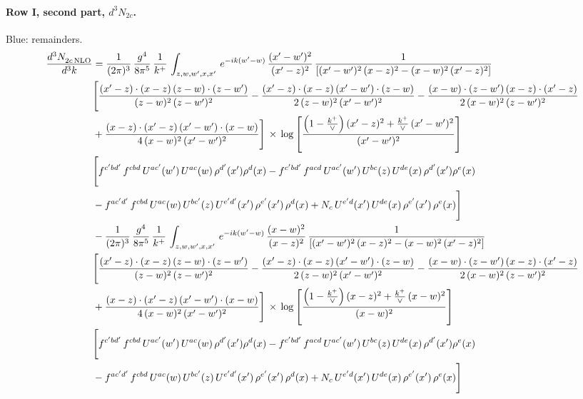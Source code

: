 \documentclass[10pt]{article}
\numberwithin{equation}{section}
\newcommand{\new}[1]{{\color{blue}#1}}
\begin{document}
\paragraph{Row I, second part, $d^3N_{2c}$.}
\new{Blue}: remainders.
\begin{align}
    \frac{d^{3}N_{2c\,\rm NLO}^{\rm}}{d^{3}k}  & =  \frac{1}{(2\pi)^{3}}\, \frac{g^{4}}{8\pi^{5}}\,\frac{1}{k^{+}}\,\int_{z,w,w^{\prime},x,x'}\, e^{-ik(w^{\prime}-w)}\,\frac{(x'-w')^{2}}{(x'-z)^{2}}\, \frac{1}{\left[(x'-w')^{2}\, (x-z)^{2} - (x-w)^{2}\, (x'-z)^{2}\right]} \notag \\ & \Bigg[\frac{(x'-z)\cdot (x-z)\, (z-w)\cdot (z-w')}{(z-w)^{2}\, (z-w')^{2}}-\frac{(x'-z)\cdot (x-z)\, (x'-w')\cdot (z-w)}{2\, (z-w)^{2}\, (x'-w')^{2}} -\frac{(x-w)\cdot (z-w')\, (x-z)\cdot (x'-z)}{2\, (x-w)^{2}\, (z-w')^{2}}\notag \\ & +\frac{(x-z)\cdot (x'-z)\, (x'-w')\cdot (x-w)}{4\, (x-w)^{2}\, (x'-w')^{2}}\Bigg]\,\times\, \log{\left[\frac{\left(1-\frac{k^{+}}{\vee}\right)(x'-z)^{2}+\frac{k^{+}}{\vee}\,(x'-w')^{2}}{(x'-w')^{2}}\right]} \notag \\ &  \Bigg[f^{c'bd'}\,f^{cbd}\, U^{ac'}(w')\,U^{ac}(w)\,\rho^{d'}(x')\rho^{d}(x)- f^{c'bd'}\,f^{acd}\,U^{ac'}(w')\,U^{bc}(z)\,U^{de}(x)\,\rho^{d'}(x')\rho^{e}(x) \notag \\ & -f^{ac'd'}\,f^{cbd}\,U^{ac}(w)\,U^{bc'}(z)\,U^{e'd'}(x')\,\rho^{e'}(x')\,\rho^{d}(x) +N_{c}\,U^{e'd}(x')\,U^{de}(x)\,\rho^{e'}(x')\,\rho^{e}(x)\Bigg] \notag \\
& -\frac{1}{(2\pi)^{3}}\, \frac{g^{4}}{8\pi^{5}}\,\frac{1}{k^{+}}\,\int_{z,w,w^{\prime},x,x'}\, e^{-ik(w^{\prime}-w)}\,\frac{(x-w)^{2}}{(x-z)^{2}}\, \frac{1}{\left[(x'-w')^{2}\, (x-z)^{2} - (x-w)^{2}\, (x'-z)^{2}\right]} \notag \\ & \Bigg[\frac{(x'-z)\cdot (x-z)\, (z-w)\cdot (z-w')}{(z-w)^{2}\, (z-w')^{2}}-\frac{(x'-z)\cdot (x-z)\, (x'-w')\cdot (z-w)}{2\, (z-w)^{2}\, (x'-w')^{2}} -\frac{(x-w)\cdot (z-w')\, (x-z)\cdot (x'-z)}{2\, (x-w)^{2}\, (z-w')^{2}}\notag \\ & +\frac{(x-z)\cdot (x'-z)\, (x'-w')\cdot (x-w)}{4\, (x-w)^{2}\, (x'-w')^{2}}\Bigg]\,\times\, \log{\left[\frac{\left(1-\frac{k^{+}}{\vee}\right)(x-z)^{2}+\frac{k^{+}}{\vee}\,(x-w)^{2}}{(x-w)^{2}}\right]} \notag \\ &  \Bigg[f^{c'bd'}\,f^{cbd}\, U^{ac'}(w')\,U^{ac}(w)\,\rho^{d'}(x')\rho^{d}(x)- f^{c'bd'}\,f^{acd}\,U^{ac'}(w')\,U^{bc}(z)\,U^{de}(x)\,\rho^{d'}(x')\rho^{e}(x) \notag \\ & -f^{ac'd'}\,f^{cbd}\,U^{ac}(w)\,U^{bc'}(z)\,U^{e'd'}(x')\,\rho^{e'}(x')\,\rho^{d}(x) +N_{c}\,U^{e'd}(x')\,U^{de}(x)\,\rho^{e'}(x')\,\rho^{e}(x)\Bigg] \label{eq:F:G2I2c}
\end{align}
\end{document}
